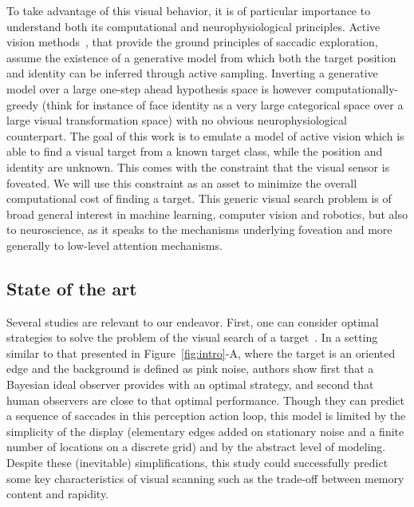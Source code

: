 
To take advantage of this visual behavior, it is of particular importance to understand both its computational and neurophysiological principles.
Active vision methods~\citep{Najemnik05,Butko2010infomax,Friston12}, that provide the ground principles of saccadic exploration, assume the existence of a generative model from which both the target position and identity can be inferred through active sampling. Inverting a generative model over a large one-step ahead hypothesis space is however computationally-greedy (think for instance of face identity as a very large categorical space over a large visual transformation space) with no obvious neurophysiological counterpart.
The goal of this work is to emulate a model of active vision which is able to find a visual target from a known target class, while the position and identity are unknown. This comes with the constraint that the visual sensor is foveated. We will use this constraint as an asset to minimize the overall computational cost of finding a target. This generic visual search problem is of broad general interest in machine learning, computer vision and robotics, but also to neuroscience, as it speaks to the mechanisms underlying foveation and more generally to low-level attention mechanisms. 
\CNS

\subsection{State of the art}
Several studies are relevant to our endeavor. First, one can consider optimal strategies to solve the problem of the visual search of a target~\citep{Najemnik05}. In a setting similar to that presented in Figure~\ref{fig:intro}-A, where the target is an oriented edge and the background is defined as pink noise, authors show first that a Bayesian ideal observer provides with an optimal strategy, and second that human observers are close to that optimal performance. Though they can predict a sequence of saccades in this perception action loop, this model is limited by the simplicity of the display (elementary edges added on stationary noise and a finite number of locations on a discrete grid) and by the abstract level of modeling. Despite these (inevitable) simplifications, this study could successfully predict some key characteristics of visual scanning such as the trade-off between memory content and rapidity.

